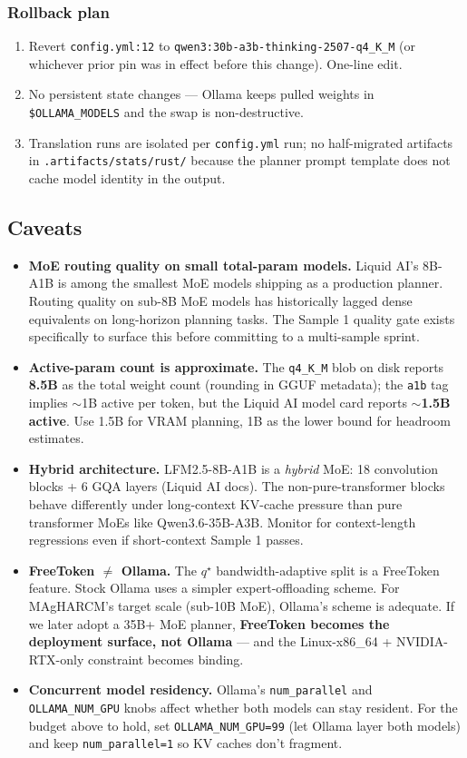 \subsubsection{Rollback plan}

\begin{enumerate}
\item Revert \texttt{config.yml:12} to \texttt{qwen3:30b-a3b-thinking-2507-q4_K_M} (or whichever prior
  pin was in effect before this change). One-line edit.
\item No persistent state changes --- Ollama keeps pulled weights in
  \texttt{\$OLLAMA\_MODELS} and the swap is non-destructive.
\item Translation runs are isolated per \texttt{config.yml} run; no
  half-migrated artifacts in \texttt{.artifacts/stats/rust/} because the
  planner prompt template does not cache model identity in the output.
\end{enumerate}

\subsection{Caveats}

\begin{itemize}
\item \textbf{MoE routing quality on small total-param models.} Liquid AI's
  8B-A1B is among the smallest MoE models shipping as a production planner.
  Routing quality on sub-8B MoE models has historically lagged dense
  equivalents on long-horizon planning tasks. The Sample 1 quality gate exists
  specifically to surface this before committing to a multi-sample sprint.
\item \textbf{Active-param count is approximate.} The \texttt{q4\_K\_M} blob on
  disk reports \textbf{8.5B} as the total weight count (rounding in GGUF
  metadata); the \texttt{a1b} tag implies $\sim$1B active per token, but the
  Liquid AI model card reports \textbf{$\sim$1.5B active}. Use 1.5B for VRAM
  planning, 1B as the lower bound for headroom estimates.
\item \textbf{Hybrid architecture.} LFM2.5-8B-A1B is a \emph{hybrid} MoE: 18
  convolution blocks + 6 GQA layers (Liquid AI docs). The non-pure-transformer
  blocks behave differently under long-context KV-cache pressure than pure
  transformer MoEs like Qwen3.6-35B-A3B. Monitor for context-length regressions
  even if short-context Sample 1 passes.
\item \textbf{FreeToken $\neq$ Ollama.} The $q^\star$ bandwidth-adaptive split
  is a FreeToken feature. Stock Ollama uses a simpler expert-offloading scheme.
  For MAgHARCM's target scale (sub-10B MoE), Ollama's scheme is adequate. If we
  later adopt a 35B+ MoE planner, \textbf{FreeToken becomes the deployment
  surface, not Ollama} --- and the Linux-x86\_64 + NVIDIA-RTX-only constraint
  becomes binding.
\item \textbf{Concurrent model residency.} Ollama's \texttt{num\_parallel} and
  \texttt{OLLAMA\_NUM\_GPU} knobs affect whether both models can stay resident.
  For the budget above to hold, set \texttt{OLLAMA\_NUM\_GPU=99} (let Ollama
  layer both models) and keep \texttt{num\_parallel=1} so KV caches don't
  fragment.
\end{itemize}
